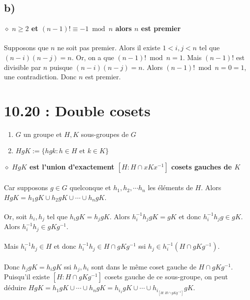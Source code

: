 \documentclass[a4paper,10pt]{article}
\begin{document}
\subsection*{b)}
$\diamond$ \textbf{$n \geq 2$ et $(n-1)! \equiv -1 \bmod n$ alors $n$ est premier}
\\
\\
Supposons que $n$ ne soit pas premier. Alors il existe $1 < i,j < n$ tel que $(n-i)(n-j) = n$. Or, on a que 
$(n-1)! \bmod n = 1$. Mais $(n-1)!$ est divisible par $n$ puisque $(n-i)(n-j) = n$. Alors $(n-1)! \bmod n = 0 = 1$, une contradiction.
Donc $n$ est premier. 

\section*{10.20 : Double cosets}
\begin{enumerate}
 \item $G$ un groupe et $H,K$ sous-groupes de $G$
 \item $HgK := \{hgk : h \in H \text{ et } k \in K\}$
\end{enumerate}
$\diamond$ \textbf{$HgK$ est l'union d'exactement $[H: H\cap xKx^{-1}]$ cosets gauches de $K$}
\\
\\
Car supposons $g \in G$ quelconque et $h_1, h_2, \cdots h_n$ les éléments de $H$. Alors $HgK = h_1 g K \cup h_2 g K \cup \cdots \cup h_n g K$.
\\
\\
Or, soit $h_i, h_j$ tel que $h_i g K = h_j g K$. Alors $h_i^{-1}h_j g K = g K$ et donc $h_i^{-1}h_j g \in gK$. Alors $h_i^{-1} h_j \in gKg^{-1}$.
\\
\\
Mais $h_i^{-1}h_j \in H$ et donc $h_i^{-1}h_j \in H \cap g K g^{-1}$ ssi $h_j \in h_i^{-1}(H \cap gKg^{-1})$.
\\
\\
Donc $h_j g K = h_i g K$ ssi $h_j, h_i$ sont dans le même coset gauche de $H \cap gKg^{-1}$. Puisqu'il existe $[H:H\cap gKg^{-1}]$ 
cosets gauche de ce sous-groupe, on peut déduire $HgK = h_1 g K \cup \cdots \cup h_n g K = h_{i_1} g K \cup \cdots \cup h_{i_{[H:H\cap gKg^{-1}]}} g K$.
\end{document}
